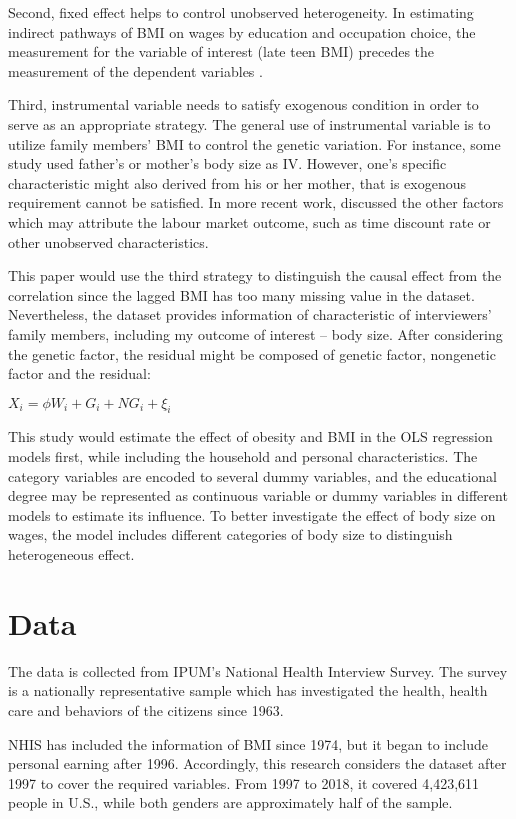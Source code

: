 \documentclass{article}
\begin{document}
\par
\setlength{\parindent}{2em}
Second, fixed effect helps to control unobserved heterogeneity. In estimating indirect pathways of BMI on wages by education and occupation choice, the measurement for the variable of interest (late teen BMI) precedes the measurement of the dependent variables \citep{norton2011identity}.
\par
\setlength{\parindent}{2em}
Third, instrumental variable needs to satisfy exogenous condition in order to serve as an appropriate strategy. The general use of instrumental variable is to utilize family members’ BMI to control the genetic variation. For instance, some study used father’s or mother’s body size as IV. However, one’s specific characteristic might also derived from his or her mother, that is exogenous requirement cannot be satisfied. In more recent work, \citet{cawley2004impact} discussed the other factors which may attribute the labour market outcome, such as time discount rate or other unobserved characteristics.
\par
\setlength{\parindent}{2em}
This paper would use the third strategy to distinguish the causal effect from the correlation since the lagged BMI has too many missing value in the dataset. Nevertheless, the dataset provides information of characteristic of interviewers’ family members, including my outcome of interest – body size. After considering the genetic factor, the residual might be composed of genetic factor, nongenetic factor and the residual:

\begin{center}
$ X_i = \phi W_i + G_i + NG_i + \xi_i $
\end{center}

This study would estimate the effect of obesity and BMI in the OLS regression models first, while including the household and personal characteristics. The category variables are encoded to several dummy variables, and the educational degree may be represented as continuous variable or dummy variables in different models to estimate its influence. To better investigate the effect of body size on wages, the model includes different categories of body size to distinguish heterogeneous effect. 

\section{Data}
The data is collected from IPUM’s National Health Interview Survey. The survey is a nationally representative sample which has investigated the health, health care and behaviors of the citizens since 1963. 
\par
\setlength{\parindent}{2em}
NHIS has included the information of BMI since 1974, but it began to include personal earning after 1996. Accordingly, this research considers the dataset after 1997 to cover the required variables. From 1997 to 2018, it covered 4,423,611 people in U.S., while both genders are approximately half of the sample. 
\end{document}
